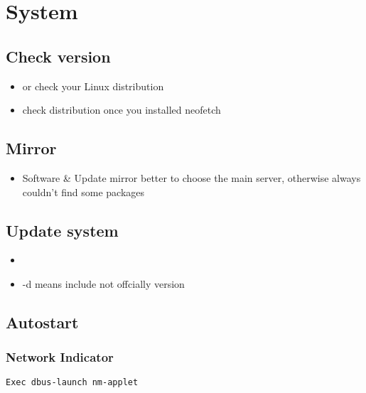 \chapter{System}


\section{Check version}

\begin{itemize}
\item{} or  check your Linux distribution
\item{} check distribution once you installed neofetch
\end{itemize}


\section{Mirror}

\begin{itemize}
\item Software \& Update mirror better to choose the main server, otherwise always couldn't find some packages
\end{itemize}


\section{Update system}
\begin{itemize}
\item{}
\item{} -d means include not offcially version
\end{itemize}


\section{Autostart}

\subsection{Network Indicator}


\begin{lstlisting}[language=bash, caption={replace Exec line nm-applet with dbus-launch nm-applet}]
Exec dbus-launch nm-applet
\end{lstlisting}


